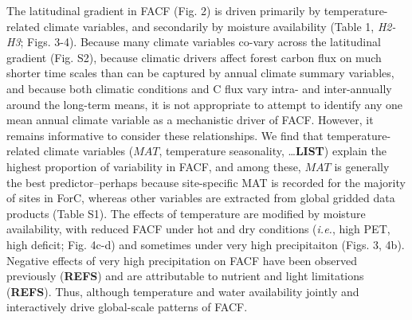 \documentclass[]{article}
\begin{document}
The latitudinal gradient in FACF (Fig. 2) is driven primarily by
temperature-related climate variables, and secondarily by moisture
availability (Table 1, \emph{H2-H3}; Figs. 3-4). Because many climate
variables co-vary across the latitudinal gradient (Fig. S2), because
climatic drivers affect forest carbon flux on much shorter time scales
than can be captured by annual climate summary variables, and because
both climatic conditions and C flux vary intra- and inter-annually
around the long-term means, it is not appropriate to attempt to identify
any one mean annual climate variable as a mechanistic driver of FACF.
However, it remains informative to consider these relationships. We find
that temperature-related climate variables (\(MAT\), temperature
seasonality, \ldots{}\textbf{LIST}) explain the highest proportion of
variability in FACF, and among these, \(MAT\) is generally the best
predictor--perhaps because site-specific MAT is recorded for the
majority of sites in ForC, whereas other variables are extracted from
global gridded data products (Table S1). The effects of temperature are
modified by moisture availability, with reduced FACF under hot and dry
conditions (\emph{i.e.}, high PET, high deficit; Fig. 4c-d) and
sometimes under very high precipitaiton (Figs. 3, 4b). Negative effects
of very high precipitation on FACF have been observed previously
(\textbf{REFS}) and are attributable to nutrient and light limitations
(\textbf{REFS}). Thus, although temperature and water availability
jointly and interactively drive global-scale patterns of FACF.
\end{document}
